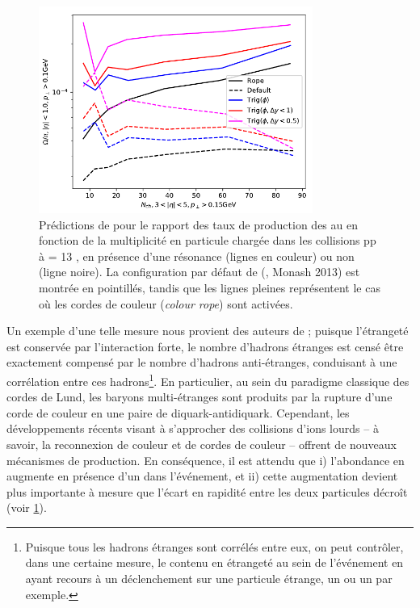 \begin{figure}[t]
\centering
\includegraphics[width=0.8\textwidth]{Figs/Chapter6/PredictionPythia_Bierlich.png}
\caption{Prédictions de \Pythiaeight pour le rapport des taux de production des \rmOmega au \rmPiPM en fonction de la multiplicité en particule chargée dans les collisions pp à \sqrtS =  13 \tev, en présence d'une résonance \rmPhiMes (lignes en couleur) ou non (ligne noire). La configuration par défaut de \Pythia (\Pythiaeight, Monash 2013) est montrée en pointillés, tandis que les lignes pleines représentent le cas où les cordes de couleur (\textit{colour rope}) sont activées.}
	\label{fig:PredictionPythia_Bierlich}
\end{figure}

Un exemple d'une telle mesure nous provient des auteurs de \Pythia ; puisque l'étrangeté est conservée par l'interaction forte, le nombre d'hadrons étranges est censé être exactement compensé par le nombre d'hadrons anti-étranges, conduisant à une corrélation entre ces hadrons\footnote{Puisque tous les hadrons étranges sont corrélés entre eux, on peut contrôler, dans une certaine mesure, le contenu en étrangeté au sein de l'événement en ayant recours à un déclenchement sur une particule étrange, un \rmXi ou un \rmOmega par exemple.}. En particulier, au sein du paradigme classique des cordes de Lund, les baryons multi-étranges sont produits par la rupture d'une corde de couleur en une paire de diquark-antidiquark. Cependant, les développements récents visant à s'approcher des collisions d'ions lourds -- à savoir, la reconnexion de couleur et de cordes de couleur \cite{christiansenStringFormationLeading2015, bierlichEffectsOverlappingStrings2015a, adolfssonQCDChallengesPp2020} -- offrent de nouveaux mécanismes de production. En conséquence, il est attendu que i) l'abondance en \rmOmega augmente en présence d'un \rmPhiMes dans l'événement, et ii) cette augmentation devient plus importante à mesure que l'écart en rapidité entre les deux particules décroît (voir \fig\ref{fig:PredictionPythia_Bierlich}).

